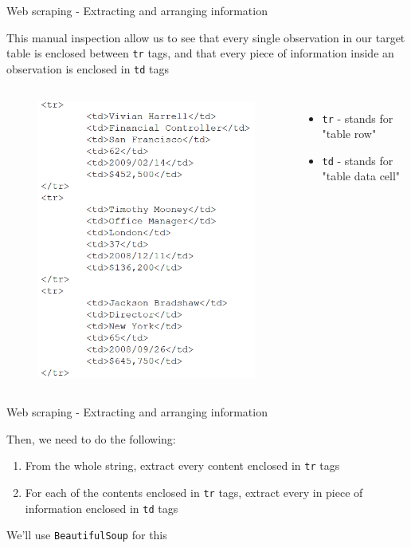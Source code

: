 \documentclass[aspectratio=169]{beamer}
\begin{document}
\begin{frame}{Web scraping - Extracting and arranging information}

	This manual inspection allow us to see that every single observation in our target table is enclosed between \texttt{tr} tags, and that every piece of information inside an observation is enclosed in \texttt{td} tags
	
	\begin{columns}[c]

		\begin{figure}
			\centering
			\includegraphics[width=0.6\linewidth]{img/tags2.png}
		\end{figure}
		
		\begin{itemize}
			\item \texttt{tr} - stands for "table row"
			\item \texttt{td} - stands for "table data cell"
		\end{itemize}
		
	\end{columns}


\end{frame}

\begin{frame}{Web scraping - Extracting and arranging information}

	Then, we need to do the following:

	\begin{enumerate}
		\item From the whole string, extract every content enclosed in \texttt{tr} tags
		\item For each of the contents enclosed in \texttt{tr} tags, extract every in piece of information enclosed in \texttt{td} tags
	\end{enumerate}

	We'll use \texttt{BeautifulSoup} for this

\end{frame}
\end{document}

